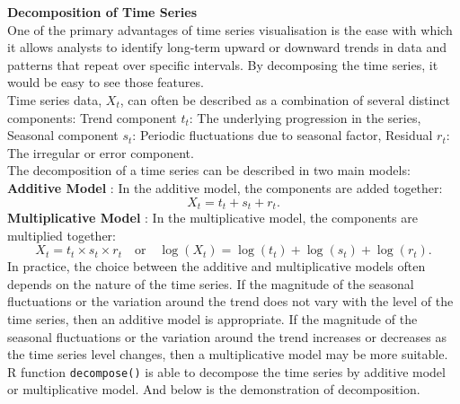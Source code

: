 \documentclass{article}\usepackage[]{graphicx}\usepackage[]{xcolor}
\numberwithin{equation}{section}
\begin{document}
\noindent
\textbf{Decomposition of Time Series}\\
\noindent
One of the primary advantages of time series visualisation is the ease with which it allows analysts to identify long-term upward or downward trends in data and patterns that repeat over specific intervals. By decomposing the time series, it would be easy to see those features.\\

\noindent
Time series data, $X_t$, can often be described as a combination of several distinct components: Trend component $t_t$: The underlying progression in the series, Seasonal component $s_t$: Periodic fluctuations due to seasonal factor, Residual $r_t$: The irregular or error component.\\

\noindent
The decomposition of a time series can be described in two main models:
\\

\noindent \textbf{Additive Model} \cite{Brockwell2016Introduction}: In the additive model, the components are added together:
\[
X_t = t_t + s_t + r_t.
\]
\textbf{Multiplicative Model} \cite{Brockwell2016Introduction}: In the multiplicative model, the components are multiplied together:
\[
X_t = t_t \times s_t \times r_t \quad \text{or} \quad \log(X_t) = \log(t_t) + \log(s_t) + \log(r_t).
\]
In practice, the choice between the additive and multiplicative models often depends on the nature of the time series. If the magnitude of the seasonal fluctuations or the variation around the trend does not vary with the level of the time series, then an additive model is appropriate. If the magnitude of the seasonal fluctuations or the variation around the trend increases or decreases as the time series level changes, then a multiplicative model may be more suitable.\\

\noindent
R function \texttt{decompose()} is able to decompose the time series by additive model or multiplicative model. And below is the demonstration of decomposition.
\end{document}
